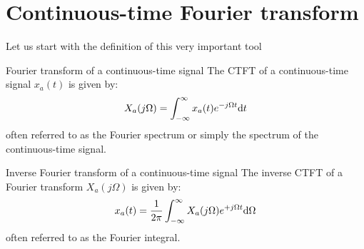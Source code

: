 \documentclass[../../main/main.tex]{subfiles}
\begin{document}

\section{Continuous-time Fourier transform}
Let us start with the definition of this very important tool

\begin{definition}{Fourier transform of a continuous-time signal}
    The CTFT of a continuous-time signal \( x_{a}(t) \) is given by:
    \begin{equation}
        X_{a}(j\Omega)
        =
        \int_{-\infty}^{\infty} x_{a}(t) e^{-j\Omega t} \mathrm{d}{t}
        \label{eq:L08_S03_1}
    \end{equation}
    often referred to as the Fourier spectrum or simply the spectrum of the continuous-time signal.
\end{definition}

\begin{definition}{Inverse Fourier transform of a continuous-time signal}
    The inverse CTFT of a Fourier transform \( X_{a}(j\Omega) \) is given by:
    \begin{equation}
        x_{a}(t)
        =
        \frac{1}{2\pi} \int_{-\infty}^{\infty} X_{a}(j\Omega) e^{+j\Omega t} \mathrm{d}{\Omega}
        \label{eq:L08_S04_1}
    \end{equation}
    often referred to as the Fourier integral.
\end{definition}
\end{document}
